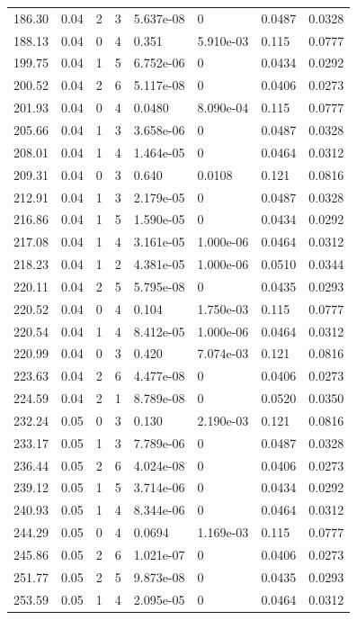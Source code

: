 \documentclass[preview]{standalone}
\begin{document}
{{{\begin{tabular}{L{1.2cm}C{1.2cm} C{0.3cm}C{0.5cm} C{1.4cm}C{1.4cm} C{1.4cm}C{1.4cm}}
  186.30  &  0.04  & 2     &  3 &  5.637e-08  & 0  & 0.0487 &  0.0328   \\ 
  188.13  &  0.04  & 0     &  4 &  0.351  & 5.910e-03  & 0.115 &  0.0777   \\ 
  199.75  &  0.04  & 1     &  5 &  6.752e-06  & 0  & 0.0434 &  0.0292   \\ 
  200.52  &  0.04  & 2     &  6 &  5.117e-08  & 0  & 0.0406 &  0.0273   \\ 
  201.93  &  0.04  & 0     &  4 &  0.0480  & 8.090e-04  & 0.115 &  0.0777   \\ 
  205.66  &  0.04  & 1     &  3 &  3.658e-06  & 0  & 0.0487 &  0.0328   \\ 
  208.01  &  0.04  & 1     &  4 &  1.464e-05  & 0  & 0.0464 &  0.0312   \\ 
  209.31  &  0.04  & 0     &  3 &  0.640  & 0.0108  & 0.121 &  0.0816   \\ 
  212.91  &  0.04  & 1     &  3 &  2.179e-05  & 0  & 0.0487 &  0.0328   \\ 
  216.86  &  0.04  & 1     &  5 &  1.590e-05  & 0  & 0.0434 &  0.0292   \\ 
  217.08  &  0.04  & 1     &  4 &  3.161e-05  & 1.000e-06  & 0.0464 &  0.0312   \\ 
  218.23  &  0.04  & 1     &  2 &  4.381e-05  & 1.000e-06  & 0.0510 &  0.0344   \\ 
  220.11  &  0.04  & 2     &  5 &  5.795e-08  & 0  & 0.0435 &  0.0293   \\ 
  220.52  &  0.04  & 0     &  4 &  0.104  & 1.750e-03  & 0.115 &  0.0777   \\ 
  220.54  &  0.04  & 1     &  4 &  8.412e-05  & 1.000e-06  & 0.0464 &  0.0312   \\ 
  220.99  &  0.04  & 0     &  3 &  0.420  & 7.074e-03  & 0.121 &  0.0816   \\ 
  223.63  &  0.04  & 2     &  6 &  4.477e-08  & 0  & 0.0406 &  0.0273   \\ 
  224.59  &  0.04  & 2     &  1 &  8.789e-08  & 0  & 0.0520 &  0.0350   \\ 
  232.24  &  0.05  & 0     &  3 &  0.130  & 2.190e-03  & 0.121 &  0.0816   \\ 
  233.17  &  0.05  & 1     &  3 &  7.789e-06  & 0  & 0.0487 &  0.0328   \\ 
  236.44  &  0.05  & 2     &  6 &  4.024e-08  & 0  & 0.0406 &  0.0273   \\ 
  239.12  &  0.05  & 1     &  5 &  3.714e-06  & 0  & 0.0434 &  0.0292   \\ 
  240.93  &  0.05  & 1     &  4 &  8.344e-06  & 0  & 0.0464 &  0.0312   \\ 
  244.29  &  0.05  & 0     &  4 &  0.0694  & 1.169e-03  & 0.115 &  0.0777   \\ 
  245.86  &  0.05  & 2     &  6 &  1.021e-07  & 0  & 0.0406 &  0.0273   \\ 
  251.77  &  0.05  & 2     &  5 &  9.873e-08  & 0  & 0.0435 &  0.0293   \\ 
  253.59  &  0.05  & 1     &  4 &  2.095e-05  & 0  & 0.0464 &  0.0312   \\ 
\hline 
\end{tabular} 

}}}
\end{document}
